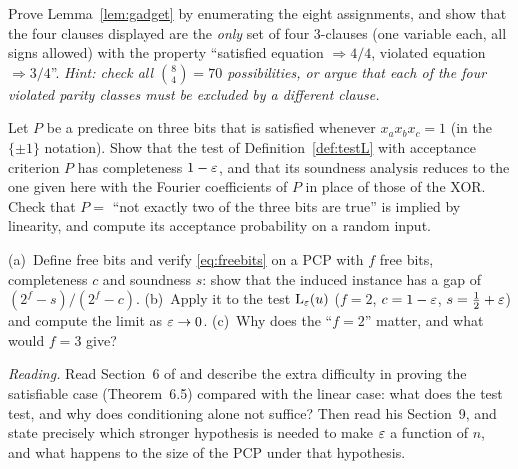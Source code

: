 \begin{exercise}[\stars{$\star\star$}]\label{ex:gadget-unique}
Prove Lemma~\ref{lem:gadget} by enumerating the eight assignments, and show that the four clauses displayed are the \emph{only} set of four $3$-clauses (one variable each, all signs allowed) with the property ``satisfied equation $\Rightarrow4/4$, violated equation $\Rightarrow3/4$''.
\emph{Hint: check all $\binom{8}{4}=70$ possibilities, or argue that each of the four violated parity classes must be excluded by a different clause.}
\end{exercise}

\begin{exercise}[\stars{$\star\star$}]\label{ex:implied-predicates}
Let $P$ be a predicate on three bits that is satisfied whenever $x_ax_bx_c=1$ (in the $\{\pm1\}$ notation).  Show that the test of Definition~\ref{def:testL} with acceptance criterion $P$ has completeness $1-\varepsilon$, and that its soundness analysis reduces to the one given here with the Fourier coefficients of $P$ in place of those of the XOR.
Check that $P=$ ``not exactly two of the three bits are true'' is implied by linearity, and compute its acceptance probability on a random input.
\end{exercise}

\begin{exercise}[\stars{$\star\star$}]\label{ex:free-bits}
(a)~Define free bits and verify \eqref{eq:freebits} on a PCP with $f$ free bits, completeness $c$ and soundness $s$: show that the induced  instance has a gap of $(2^f-s)/(2^f-c)$.
(b)~Apply it to the test $\mathrm{L}_\varepsilon(u)$ ($f=2$, $c=1-\varepsilon$, $s=\tfrac12+\varepsilon$) and compute the limit as $\varepsilon\to0$.
(c)~Why does the ``$f=2$'' matter, and what would $f=3$ give?
\end{exercise}

\begin{exercise}[\stars{$\star\star\star$}]\label{ex:reading-hastad}
\emph{Reading.}  Read Section~6 of \cite{Hastad01} and describe the extra difficulty in proving the satisfiable case (Theorem~6.5) compared with the linear case: what does the test test, and why does conditioning alone not suffice?
Then read his Section~9, and state precisely which stronger hypothesis is needed to make $\varepsilon$ a function of $n$, and what happens to the size of the PCP under that hypothesis.
\end{exercise}


